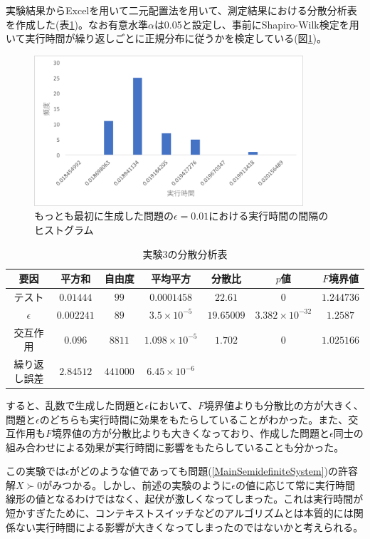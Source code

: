 実験結果からExcelを用いて二元配置法を用いて、測定結果における分散分析表を作成した(表\ref{AnalysisOfVarianceTable})。なお有意水準$\alpha$は0.05と設定し、事前にShapiro-Wilk検定を用いて実行時間が繰り返しごとに正規分布に従うかを検定している(図\ref{Regular})。
\begin{figure}
  \centering
  \includegraphics[width=10cm]{execute_time.png}
  \caption{もっとも最初に生成した問題の$\epsilon = 0.01$における実行時間の間隔のヒストグラム}
  \label{Regular}
\end{figure}
\begin{table}
  \centering
  \caption{実験3の分散分析表}
  \label{AnalysisOfVarianceTable}
  \begin{tabular}{c|cccccc} \hline
    要因         & 平方和     & 自由度   & 平均平方              & 分散比     & $p$値                 & $F$境界値 \\ \hline
    テスト       & $0.01444$ & $99$     & $0.0001458$            & $22.61$ & $0$ & $1.244736$ \\
    $\epsilon$   & $0.002241$  & $89$     & $3.5 \times 10^{-5}$  & $19.65009$ & $3.382 \times 10^{-32}$ & $1.2587$ \\
    交互作用     & $0.096$ & $8811$   & $1.098 \times 10^{-5}$ & $1.702$ & $0$                   & $1.025166$ \\
    繰り返し誤差 & $2.84512$ & $441000$ & $6.45 \times 10^{-6}$ &            &                       & \\ \hline
  \end{tabular}
\end{table}
すると、乱数で生成した問題と$\epsilon$において、$F$境界値よりも分散比の方が大きく、問題と$\epsilon$のどちらも実行時間に効果をもたらしていることがわかった。また、交互作用も$F$境界値の方が分散比よりも大きくなっており、作成した問題と$\epsilon$同士の組み合わせによる効果が実行時間に影響をもたらしていることも分かった。

この実験では$\epsilon$がどのような値であっても問題(\ref{MainSemidefiniteSystem})の許容解$X \succ 0$がみつかる。しかし、前述の実験のように$\epsilon$の値に応じて常に実行時間線形の値となるわけではなく、起伏が激しくなってしまった。これは実行時間が短かすぎたために、コンテキストスイッチなどのアルゴリズムとは本質的には関係ない実行時間による影響が大きくなってしまったのではないかと考えられる。

